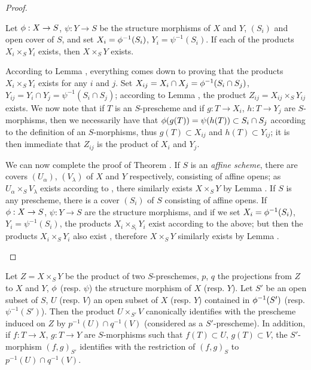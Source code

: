 \begin{proof}
\begin{lem}[3.2.6.4]
\label{1.3.2.6.4}
Let $\vphi:X\to S$, $\psi:Y\to S$ be the structure morphisms of $X$ and $Y$, $(S_i)$ and open
cover of $S$, and set $X_i=\phi^{-1}(S_i)$, $Y_i=\psi^{-1}(S_i)$. If each of the products
$X_i\times_S Y_i$ exists, then $X\times_S Y$ exists.
\end{lem}

According to Lemma , everything comes down to proving that the products
$X_i\times_S Y_i$ exists for any $i$ and $j$. Set
$X_{ij}=X_i\cap X_j=\phi^{-1}(S_i\cap S_j)$, $Y_{ij}=Y_i\cap Y_j=\psi^{-1}(S_i\cap S_j)$;
according to Lemma , the product $Z_{ij}=X_{ij}\times_S Y_{ij}$ exists. We now
note that if $T$ is an $S$-prescheme and if $g:T\to X_i$, $h:T\to Y_j$ are $S$-morphisms,
then we necessarily have that $\phi(g(T))=\psi(h(T))\subset S_i\cap S_j$ according to the
definition of an $S$-morphisms, thus $g(T)\subset X_{ij}$ and $h(T)\subset Y_{ij}$; it is
then immediate that $Z_{ij}$ is the product of $X_i$ and $Y_j$.

\begin{env}[3.2.6.5]
\label{1.3.2.6.5}
We can now complete the proof of Theorem . If $S$ is an \emph{affine
scheme}, there are covers $(U_\alpha)$, $(V_\lambda)$ of $X$ and $Y$ respectively,
consisting of affine opens; as $U_\alpha\times_S V_\lambda$ exists according to
, there similarly exists $X\times_S Y$ by Lemma . If $S$
is any prescheme, there is a cover $(S_i)$ of $S$ consisting of affine opens. If
$\vphi:X\to S$, $\psi:Y\to S$ are the structure morphisms, and if we set
$X_i=\phi^{-1}(S_i)$, $Y_i=\psi^{-1}(S_i)$, the products $X_i\times_{S_i}Y_i$ exist
according to the
above; but then the products $X_i\times_S Y_i$ also exist , therefore
$X\times_S Y$ similarly exists by Lemma .
\end{env}
\end{proof}

\begin{cor}[3.2.7]
\label{1.3.2.7}
Let $Z=X\times_S Y$ be the product of two $S$-preschemes, $p$, $q$ the projections from $Z$
to $X$ and $Y$, $\phi$ (resp. $\psi$) the structure morphism of $X$ (resp. $Y$). Let $S'$ be
an open subset of $S$, $U$ (resp. $V$) an open subset of $X$ (resp. $Y$) contained in
$\phi^{-1}(S')$ (resp. $\psi^{-1}(S')$). Then the product $U\times_{S'}V$ canonically
identifies with the prescheme induced on $Z$ by $p^{-1}(U)\cap q^{-1}(V)$ (considered as a
$S'$-prescheme). In addition, if $f:T\to X$, $g:T\to Y$ are $S$-morphisms such that
$f(T)\subset U$, $g(T)\subset V$, the $S'$-morphism $(f,g)_{S'}$ identifies with the
restriction of $(f,g)_S$ to $p^{-1}(U)\cap q^{-1}(V)$.
\end{cor}

